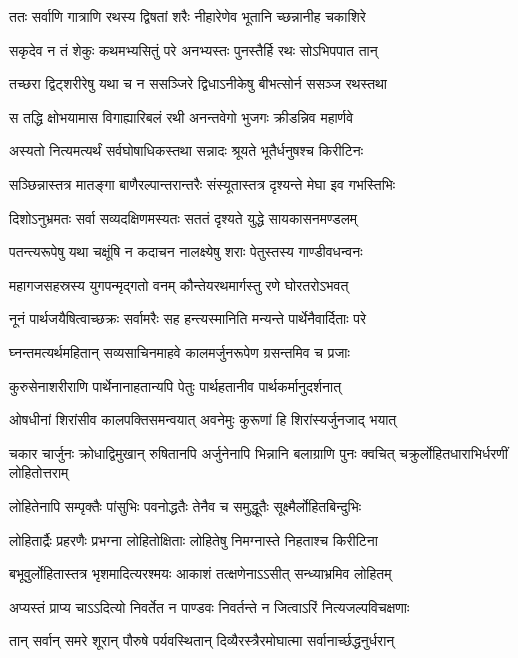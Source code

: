 \twolineshloka
{ततः सर्वाणि गात्राणि रथस्य द्विषतां शरैः}
{नीहारेणेव भूतानि च्छन्नानीह चकाशिरे}


\twolineshloka
{सकृदेव न तं शेकुः कथमभ्यसितुं परे}
{अनभ्यस्तः पुनस्तैर्हि रथः सोऽभिपपात तान्}


\twolineshloka
{तच्छरा द्विट्शरीरेषु यथा च न ससञ्जिरे}
{द्विधाऽनीकेषु बीभत्सोर्न ससञ्ज रथस्तथा}


\twolineshloka
{स तद्धि क्षोभयामास विगाह्यारिबलं रथी}
{अनन्तवेगो भुजगः क्रीडन्निव महार्णवे}


\twolineshloka
{अस्यतो नित्यमत्यर्थं सर्वघोषाधिकस्तथा}
{सन्नादः श्रूयते भूतैर्धनुषश्च किरीटिनः}


\twolineshloka
{सञ्छिन्नास्तत्र मातङ्गा बाणैरल्पान्तरान्तरैः}
{संस्यूतास्तत्र दृश्यन्ते मेघा इव गभस्तिभिः}


\twolineshloka
{दिशोऽनुभ्रमतः सर्वा सव्यदक्षिणमस्यतः}
{सततं दृश्यते युद्धे सायकासनमण्डलम्}


\twolineshloka
{पतन्त्यरूपेषु यथा चक्षूंषि न कदाचन}
{नालक्ष्येषु शराः पेतुस्तस्य गाण्डीवधन्वनः}


\twolineshloka
{महागजसहस्रस्य युगपन्मृद्गतो वनम्}
{कौन्तेयरथमार्गस्तु रणे घोरतरोऽभवत्}


\twolineshloka
{नूनं पार्थजयैषित्वाच्छक्रः सर्वामरैः सह}
{हन्त्यस्मानिति मन्यन्ते पार्थेनैवार्दिताः परे}


\twolineshloka
{घ्नन्तमत्यर्थमहितान् सव्यसाचिनमाहवे}
{कालमर्जुनरूपेण ग्रसन्तमिव च प्रजाः}


\twolineshloka
{कुरुसेनाशरीराणि पार्थेनानाहतान्यपि}
{पेतुः पार्थहतानीव पार्थकर्मानुदर्शनात्}


\twolineshloka
{ओषधीनां शिरांसीव कालपक्तिसमन्वयात्}
{अवनेमुः कुरूणां हि शिरांस्यर्जुनजाद् भयात्}


\onelineshloka
{चकार चार्जुनः क्रोधाद्विमुखान् रुषितानपि}
\twolineshloka
{अर्जुनेनापि भिन्नानि बलाग्राणि पुनः क्वचित्}
{चक्रुर्लोहितधाराभिर्धरणीं लोहितोत्तराम्}


\twolineshloka
{लोहितेनापि सम्पृक्तैः पांसुभिः पवनोद्धतैः}
{तेनैव च समुद्धूतैः सूक्ष्मैर्लोहितबिन्दुभिः}


\twolineshloka
{लोहितार्द्रैः प्रहरणैः प्रभग्ना लोहितोक्षिताः}
{लोहितेषु निमग्नास्ते निहताश्च किरीटिना}


\twolineshloka
{बभूवुर्लोहितास्तत्र भृशमादित्यरश्मयः}
{आकाशं तत्क्षणेनाऽऽसीत् सन्ध्याभ्रमिव लोहितम्}


\twolineshloka
{अप्यस्तं प्राप्य चाऽऽदित्यो निवर्तेत न पाण्डवः}
{निवर्तन्ते न जित्वाऽरिं नित्यजल्पविचक्षणाः}


\twolineshloka
{तान् सर्वान् समरे शूरान् पौरुषे पर्यवस्थितान्}
{दिव्यैरस्त्रैरमोघात्मा सर्वानार्च्छद्धनुर्धरान्}


